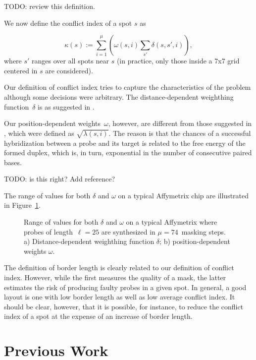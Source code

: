 \documentclass{bioinfo}
\begin{document}
TODO: review this definition.

We now define the conflict index of a spot $s$ as

\begin{equation}
\label{eq:conf_idx} \kappa(s) := \sum_{i=1}^{\mu} \left( \omega(s,i) \sum_{s'} \delta(s,s',i) \right),
\end{equation}
where $s'$ ranges over all spots near $s$ (in practice, only those inside a 7x7 grid centered in $s$ are considered).

Our definition of conflict index tries to capture the characteristics of the problem although some decisions were arbitrary. The distance-dependent weighthing function~$\delta$ is as suggested in \citealp{KAHNG03_1}.

Our position-dependent weights~$\omega$, however, are different from those suggested in \citealp{KAHNG03_1}, which were defined as $\sqrt{\lambda(s,i)}$. The reason is that the chances of a successful hybridization between a probe and its target is related to the free energy of the formed duplex, which is, in turn, exponential in the number of consecutive paired bases.

TODO: is this right? Add reference?

The range of values for both $\delta$ and $\omega$ on a typical Affymetrix chip are illustrated in Figure~\ref{fig:conflit_index_values}.

\begin{figure}
\caption{Range of values for both $\delta$ and $\omega$ on a typical Affymetrix where probes of length~$\ell = 25$ are synthesized in $\mu = 74$~masking steps. a) Distance-dependent weighthing function $\delta$; b) position-dependent weights $\omega$.}
\label{fig:conflit_index_values}
\end{figure}

The definition of border length is clearly related to our definition of conflict index. However, while the first measures the quality of a mask, the latter estimates the risk of producing faulty probes in a given spot. In general, a good layout is one with low border length as well as low average conflict index. It should be clear, however, that it is possible, for instance, to reduce the conflict index of a spot at the expense of an increase of border length.

\section{Previous Work}
\end{document}

